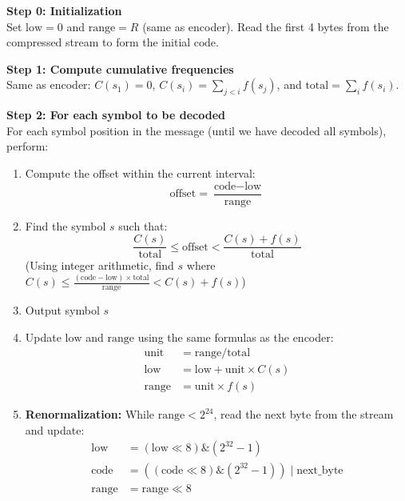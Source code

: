 \documentclass[12pt]{article}
\begin{document}
\begin{tcolorbox}[colback=blue!3,colframe=blue!40!black,title=Algorithm: Range Coding Decoding]
\textbf{Step 0: Initialization} \\
Set $\text{low} = 0$ and $\text{range} = R$ (same as encoder). Read the first 4 bytes from the compressed stream to form the initial $\text{code}$.

\vspace{2mm}
\textbf{Step 1: Compute cumulative frequencies} \\
Same as encoder: $C(s_1) = 0$, $C(s_i) = \sum_{j < i} f(s_j)$, and $\text{total} = \sum_i f(s_i)$.

\vspace{2mm}
\textbf{Step 2: For each symbol to be decoded} \\
For each symbol position in the message (until we have decoded all symbols), perform:
\begin{enumerate}
    \item Compute the offset within the current interval:
    \[
    \text{offset} = \frac{\text{code} - \text{low}}{\text{range}}
    \]
    \item Find the symbol $s$ such that:
    \[
    \frac{C(s)}{\text{total}} \le \text{offset} < \frac{C(s) + f(s)}{\text{total}}
    \]
    (Using integer arithmetic, find $s$ where $C(s) \le \frac{(\text{code} - \text{low}) \times \text{total}}{\text{range}} < C(s) + f(s)$)
    
    \item Output symbol $s$
    
    \item Update $\text{low}$ and $\text{range}$ using the same formulas as the encoder:
    \begin{align*}
    \text{unit} &= \text{range} / \text{total} \\
    \text{low} &= \text{low} + \text{unit} \times C(s) \\
    \text{range} &= \text{unit} \times f(s)
    \end{align*}
    
    \item \textbf{Renormalization:} While $\text{range} < 2^{24}$, read the next byte from the stream and update:
    \begin{align*}
    \text{low} &= (\text{low} \ll 8) \mathrel{\&} (2^{32}-1) \\
    \text{code} &= ((\text{code} \ll 8) \mathrel{\&} (2^{32}-1)) \mid \text{next\_byte} \\
    \text{range} &= \text{range} \ll 8
    \end{align*}
\end{enumerate}
\end{tcolorbox}
\end{document}
